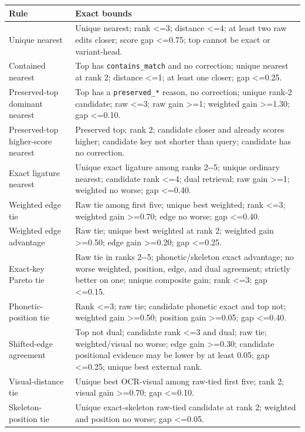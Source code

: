 {\def\LTcaptype{none} %
\begin{longtable}[]{@{}>{\RaggedRight\arraybackslash}p{.27\linewidth}>{\RaggedRight\arraybackslash}p{.66\linewidth}@{}}
\toprule\noalign{}
Rule & Exact bounds \\
\midrule\noalign{}
\endhead
\bottomrule\noalign{}
\endlastfoot
Unique nearest & Unique nearest; rank \textless=3; distance \textless=4; at least two raw edits closer; score gap \textless=0.75; top cannot be exact or variant-head. \\
Contained nearest & Top has \texttt{contains\_\allowbreak{}match} and no correction; unique nearest at rank 2; distance \textless=1; at least one closer; gap \textless=0.25. \\
Preserved-top dominant nearest & Top has a \texttt{preserved\_\allowbreak{}*} reason, no correction; unique rank-2 candidate; raw \textless=3; raw gain \textgreater=1; weighted gain \textgreater=1.30; gap \textless=0.10. \\
Preserved-top higher-score nearest & Preserved top; rank 2; candidate closer and already scores higher; candidate key not shorter than query; candidate has no correction. \\
Exact ligature nearest & Unique exact ligature among ranks 2-\/-5; unique ordinary nearest; candidate rank \textless=4; dual retrieval; raw gain \textgreater=1; weighted no worse; gap \textless=0.40. \\
Weighted edge tie & Raw tie among first five; unique best weighted; rank \textless=3; weighted gain \textgreater=0.70; edge no worse; gap \textless=0.40. \\
Weighted edge advantage & Raw tie; unique best weighted at rank 2; weighted gain \textgreater=0.50; edge gain \textgreater=0.20; gap \textless=0.25. \\
Exact-key Pareto tie & Raw tie in ranks 2-\/-5; phonetic/skeleton exact advantage; no worse weighted, position, edge, and dual agreement; strictly better on one; unique composite gain; rank \textless=3; gap \textless=0.15. \\
Phonetic-position tie & Rank \textless=3; raw tie; candidate phonetic exact and top not; weighted gain \textgreater=0.50; position gain \textgreater=0.05; gap \textless=0.40. \\
Shifted-edge agreement & Top not dual; candidate rank \textless=3 and dual; raw tie; weighted/visual no worse; edge gain \textgreater=0.30; candidate positional evidence may be lower by at least 0.05; gap \textless=0.25; unique best external rank. \\
Visual-distance tie & Unique best OCR-visual among raw-tied first five; rank 2; visual gain \textgreater=0.70; gap \textless=0.10. \\
Skeleton-position tie & Unique exact-skeleton raw-tied candidate at rank 2; weighted and position no worse; gap \textless=0.05. \\
\end{longtable}
}

